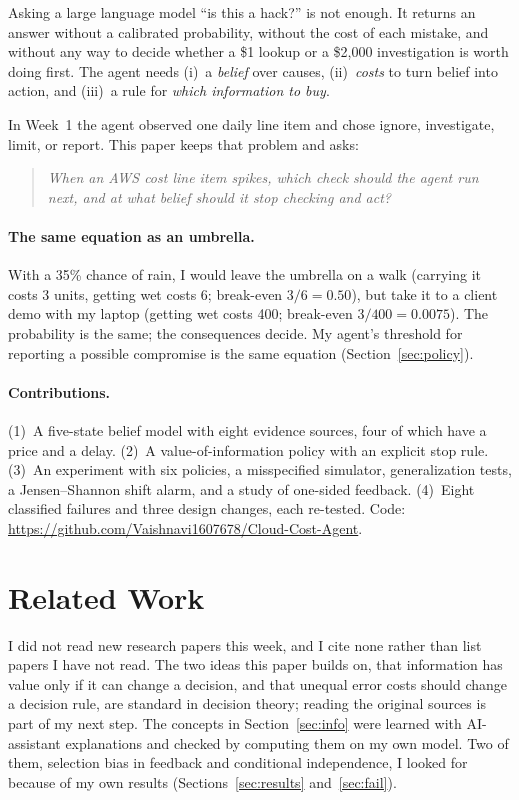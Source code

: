 \documentclass{article}
\begin{document}
Asking a large language model ``is this a hack?'' is not enough. It returns an answer without a calibrated probability, without the cost of each mistake, and without any way to decide whether a \$1 lookup or a \$2,000 investigation is worth doing first. The agent needs (i)~a \emph{belief} over causes, (ii)~\emph{costs} to turn belief into action, and (iii)~a rule for \emph{which information to buy}.

In Week~1 the agent observed one daily line item and chose ignore, investigate, limit, or report. This paper keeps that problem and asks:

\begin{quote}\emph{When an AWS cost line item spikes, which check should the agent run next, and at what belief should it stop checking and act?}\end{quote}

\paragraph{The same equation as an umbrella.} With a 35\% chance of rain, I would leave the umbrella on a walk (carrying it costs 3 units, getting wet costs 6; break-even $3/6=0.50$), but take it to a client demo with my laptop (getting wet costs 400; break-even $3/400=0.0075$). The probability is the same; the consequences decide. My agent's threshold for reporting a possible compromise is the same equation (Section~\ref{sec:policy}).

\paragraph{Contributions.} (1)~A five-state belief model with eight evidence sources, four of which have a price and a delay. (2)~A value-of-information policy with an explicit stop rule. (3)~An experiment with six policies, a misspecified simulator, generalization tests, a Jensen--Shannon shift alarm, and a study of one-sided feedback. (4)~Eight classified failures and three design changes, each re-tested. Code: \url{https://github.com/Vaishnavi1607678/Cloud-Cost-Agent}.

\section{Related Work}

I did not read new research papers this week, and I cite none rather than list papers I have not read. The two ideas this paper builds on, that information has value only if it can change a decision, and that unequal error costs should change a decision rule, are standard in decision theory; reading the original sources is part of my next step. The concepts in Section~\ref{sec:info} were learned with AI-assistant explanations and checked by computing them on my own model. Two of them, selection bias in feedback and conditional independence, I looked for because of my own results (Sections~\ref{sec:results} and~\ref{sec:fail}).
\end{document}
